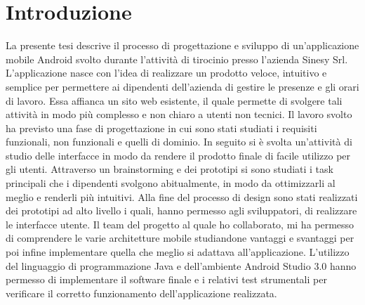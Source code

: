 \documentclass[12pt]{report}
\date{21 Novembre 2019} %
\author{Alberto Caliman}
\begin{document}
\maketitle %
\newpage\null\thispagestyle{empty}\newpage
\tableofcontents %
\newpage

  \chapter*{Introduzione}
  La presente tesi descrive il processo di progettazione e sviluppo di un'applicazione mobile Android svolto durante l'attività di tirocinio presso l'azienda Sinesy Srl\cite{Sinesy}.\\
  L'applicazione nasce con l'idea di realizzare un prodotto veloce, intuitivo e semplice per permettere ai dipendenti dell'azienda di gestire le presenze e gli orari di lavoro. Essa affianca un sito web esistente, il quale permette di svolgere tali attività in modo più complesso e non chiaro a utenti non tecnici.
 Il lavoro svolto ha previsto una fase di progettazione in cui sono stati studiati i requisiti funzionali, non funzionali e quelli di dominio. In seguito si è svolta un'attività di studio delle interfacce in modo da rendere il prodotto finale di facile utilizzo per gli utenti. Attraverso un brainstorming e dei prototipi si sono studiati i task principali che i dipendenti svolgono abitualmente, in modo da ottimizzarli al meglio e renderli più intuitivi. Alla fine del processo di design sono stati realizzati dei prototipi ad alto livello i quali, hanno permesso agli sviluppatori, di realizzare le interfacce utente. Il team del progetto al quale ho collaborato, mi ha permesso di comprendere le varie architetture mobile studiandone vantaggi e svantaggi per poi infine implementare quella che meglio si adattava all'applicazione. L'utilizzo del linguaggio di programmazione Java e dell'ambiente Android Studio 3.0\cite{Android} hanno permesso di implementare il software finale e i relativi test strumentali per verificare il corretto funzionamento dell'applicazione realizzata.

\end{document}
